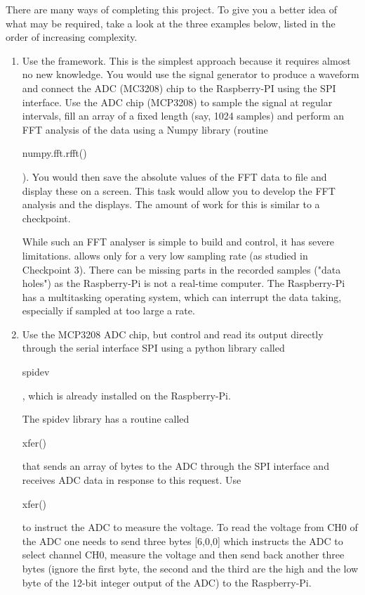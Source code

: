 There are many ways of completing this project. To give you a better idea of what may be required, take a look at the three examples below, listed in the order of increasing complexity. 

\begin{enumerate}
\item	Use the \webiopi framework. This is the simplest approach because it requires almost no new knowledge. You would use the signal generator to produce a waveform and connect the ADC (MC3208) chip to the Raspberry-PI using the SPI interface. Use the ADC chip (MCP3208) to sample the signal at regular intervals, fill an array of a fixed length (say, 1024 samples) and perform an FFT analysis of the data using a Numpy library (routine  \begin{tt}numpy.fft.rfft()\end{tt}).
 You would then save the absolute values of the FFT data to file and display these on a screen. This task would allow you to develop the FFT analysis and the displays. The amount of work for this is similar to a checkpoint. 

While such an FFT analyser is simple to build and control, it has severe limitations. \webiopi allows only for a very low sampling rate (as studied in Checkpoint 3). There can be missing parts in the recorded samples ("data holes") as the Raspberry-Pi is not a real-time computer. The Raspberry-Pi has a multitasking operating system, which can interrupt the data taking, especially if sampled at too large a rate.

\item Use the MCP3208 ADC chip, but control and read its output directly through the serial interface SPI using a python library called \begin{tt}spidev\end{tt}, which is already installed on the Raspberry-Pi.
%

%
The spidev library has a routine called \begin{tt}xfer()\end{tt}  that sends an array of bytes to the ADC through the SPI interface and receives ADC data in response to this request. Use \begin{tt}xfer()\end{tt}   to instruct the ADC to measure the voltage. To read the voltage from CH0 of the ADC one needs to send three bytes [6,0,0] 
which instructs the ADC to select channel CH0, measure the voltage and then send back another three bytes (ignore the first byte, the second and the third are the high and the low byte of the 12-bit integer output of the ADC) to the Raspberry-Pi.


\end{enumerate}
